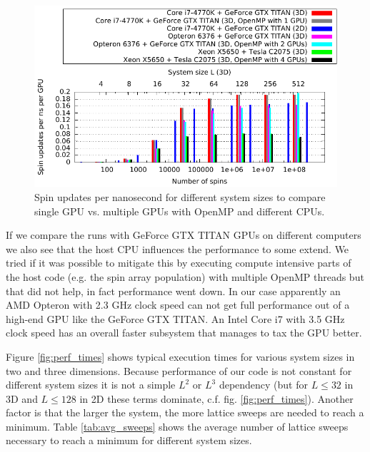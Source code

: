 \documentclass[paper=a4, fontsize=11pt]{scrartcl} %
\numberwithin{equation}{section} %
\numberwithin{figure}{section} %
\numberwithin{table}{section} %
\begin{document}
\begin{figure}
\centering
\includegraphics[width=\textwidth]{images/perf_flips.pdf}
\caption{Spin updates per nanosecond for different system sizes to compare single GPU vs. multiple GPUs with OpenMP and different CPUs.}
\label{fig:perf_flips}
\end{figure}

If we compare the runs with GeForce GTX TITAN GPUs on different computers we also see that the host CPU influences the performance to some extend. We tried if it was possible to mitigate this by executing compute intensive parts of the host code (e.g. the spin array population) with multiple OpenMP threads but that did not help, in fact performance went down. In our case apparently an AMD Opteron with 2.3 GHz clock speed can not get full performance out of a high-end GPU like the GeForce GTX TITAN. An Intel Core i7 with 3.5 GHz clock speed has an overall faster subsystem that manages to tax the GPU better.

Figure \ref{fig:perf_times} shows typical execution times for various system sizes in two and three dimensions. Because performance of our code is not constant for different system sizes it is not a simple $L^2$ or $L^3$ dependency (but for $L\leq32$ in 3D and $L\leq128$ in 2D these terms dominate, c.f. fig. \ref{fig:perf_times}). Another factor is that the larger the system, the more lattice sweeps are needed to reach a minimum. Table \ref{tab:avg_sweeps} shows the average number of lattice sweeps necessary to reach a minimum for different system sizes.
\end{document}
